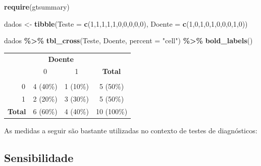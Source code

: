 \documentclass[
]{book}
\newenvironment{Shaded}{\begin{snugshade}}{\end{snugshade}}
\newcommand{\AttributeTok}[1]{\textcolor[rgb]{0.13,0.29,0.53}{#1}}
\newcommand{\DecValTok}[1]{\textcolor[rgb]{0.00,0.00,0.81}{#1}}
\newcommand{\FunctionTok}[1]{\textcolor[rgb]{0.13,0.29,0.53}{\textbf{#1}}}
\newcommand{\NormalTok}[1]{#1}
\newcommand{\OtherTok}[1]{\textcolor[rgb]{0.56,0.35,0.01}{#1}}
\newcommand{\SpecialCharTok}[1]{\textcolor[rgb]{0.81,0.36,0.00}{\textbf{#1}}}
\newcommand{\StringTok}[1]{\textcolor[rgb]{0.31,0.60,0.02}{#1}}
\begin{document}
\begin{Shaded}
\begin{Highlighting}[]
\FunctionTok{require}\NormalTok{(gtsummary)}

\NormalTok{dados }\OtherTok{\textless{}{-}} \FunctionTok{tibble}\NormalTok{(}\AttributeTok{Teste =} \FunctionTok{c}\NormalTok{(}\DecValTok{1}\NormalTok{,}\DecValTok{1}\NormalTok{,}\DecValTok{1}\NormalTok{,}\DecValTok{1}\NormalTok{,}\DecValTok{1}\NormalTok{,}\DecValTok{0}\NormalTok{,}\DecValTok{0}\NormalTok{,}\DecValTok{0}\NormalTok{,}\DecValTok{0}\NormalTok{,}\DecValTok{0}\NormalTok{),}
                \AttributeTok{Doente =} \FunctionTok{c}\NormalTok{(}\DecValTok{1}\NormalTok{,}\DecValTok{0}\NormalTok{,}\DecValTok{1}\NormalTok{,}\DecValTok{0}\NormalTok{,}\DecValTok{1}\NormalTok{,}\DecValTok{0}\NormalTok{,}\DecValTok{0}\NormalTok{,}\DecValTok{0}\NormalTok{,}\DecValTok{1}\NormalTok{,}\DecValTok{0}\NormalTok{))}

\NormalTok{dados }\SpecialCharTok{\%\textgreater{}\%} \FunctionTok{tbl\_cross}\NormalTok{(Teste, Doente, }\AttributeTok{percent =} \StringTok{"cell"}\NormalTok{) }\SpecialCharTok{\%\textgreater{}\%}
  \FunctionTok{bold\_labels}\NormalTok{()}
\end{Highlighting}
\end{Shaded}

\begin{table}[t]
\fontsize{12.0pt}{14.4pt}\selectfont
\begin{tabular*}{\linewidth}{@{\extracolsep{\fill}}lccc}
\toprule
 & \multicolumn{2}{c}{\textbf{Doente}} &  \\ 
\cmidrule(lr){2-3}
 & 0 & 1 & \textbf{Total} \\ 
\midrule\addlinespace[2.5pt]
{\bfseries Teste} &  &  &  \\ 
    0 & 4 (40\%) & 1 (10\%) & 5 (50\%) \\ 
    1 & 2 (20\%) & 3 (30\%) & 5 (50\%) \\ 
{\bfseries Total} & 6 (60\%) & 4 (40\%) & 10 (100\%) \\ 
\bottomrule
\end{tabular*}
\end{table}

As medidas a seguir são bastante utilizadas no contexto de testes de diagnósticos:

\subsection{Sensibilidade}\label{sensibilidade}
\end{document}

